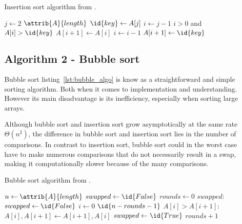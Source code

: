 \documentclass[sigconf, nonacm, natbib, screen, balance=False]{acmart}
\begin{document}
\begin{listing}
  \caption{Insertion sort algorithm from \citet[Ch.~2.1]{CLRS_2009}.}
  \label{lst:insertion_algo}

  \begin{codebox}
    \li \For $j \gets 2$ \To $\attrib{A}{length}$
    \li \Do
    $\id{key} \gets A[j]$
    \li     $i \gets j-1$
    \li      \While $i>0$ and $A[i] > \id{key}$
    \li      \Do
    $A[i+1] \gets A[i]$
    \li         $i \gets i-1$
    \End    
    \li       $A[i+1]\gets \id{key}$
    \End
  \end{codebox}
\end{listing}

\subsection{Algorithm 2 - Bubble sort}\label{sec:algo2}

Bubble sort listing~\ref{lst:bubble_algo} is know as a straightforward and simple sorting algorithm. Both when it comes to implementation and understanding. However its main disadvantage is its inefficiency, especially when sorting large arrays. 

Although bubble sort and insertion sort grow asymptotically at the same rate $\Theta(n^2)$, the difference in bubble sort and insertion sort lies in the number of comparisons. In contrast to insertion sort, bubble sort could in the worst case have to make numerous comparisons that do not necessarily result in a swap, making it computationally slower because of the many comparisons. 

\begin{listing}
  \caption{Bubble sort algorithm from \citet[Ch.~2.1]{CLRS_2009}.}
  \label{lst:bubble_algo}

  \begin{codebox}
    \li $n \gets \attrib{A}{length}$
    \li $swapped \gets \id{False}$
    \li $rounds \gets 0$
    \li \While $swapped:$
    \li \Do
    $swapped \gets \id{False}$
    \li \For $i \gets 0 $ \To $\id{n - rounds - 1}$
    \li     \Do
    \If $A[i] > A[i+1]:$
    \li     \Do
    $A[i], A[i+1] \gets A[i+1], A[i]$
    \li $swapped \gets \id{True}$
    \End
    \End    
    \li $rounds + 1$
    \End
  \end{codebox}
\end{listing}
\end{document}
